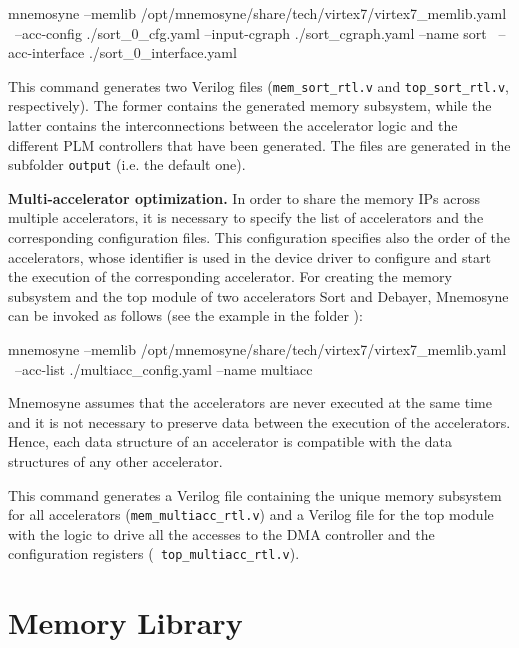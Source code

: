 \begin{commandshell}{}
  mnemosyne --memlib /opt/mnemosyne/share/tech/virtex7/virtex7_memlib.yaml  \                 --acc-config ./sort_0_cfg.yaml --input-cgraph ./sort_cgraph.yaml --name sort \
        --acc-interface ./sort_0_interface.yaml \end{commandshell}

\noindent This command generates two Verilog files ({\tt mem\_sort\_rtl.v}
and {\tt top\_sort\_rtl.v}, respectively). The former contains the
generated memory subsystem, while the latter contains the interconnections
between the accelerator logic and the different PLM controllers that have been
generated.  The files are generated in the subfolder {\tt output} (i.e. the
default one).

\vspace{4pt}
{\bf Multi-accelerator optimization.} In order to share the memory IPs across
multiple accelerators, it is necessary to specify the list of accelerators and
the corresponding configuration files. This configuration specifies also the
order of the accelerators, whose identifier is used in the device driver to
configure and start the execution of the corresponding accelerator. For creating the
memory subsystem and the top module of two accelerators {\sc Sort} and {\sc
Debayer}, {\sc Mnemosyne} can be invoked as follows (see the example in the folder ):

\begin{commandshell}{}
  mnemosyne --memlib /opt/mnemosyne/share/tech/virtex7/virtex7_memlib.yaml  \                 --acc-list ./multiacc_config.yaml --name multiacc
\end{commandshell}

\begin{lattention}
{\sc Mnemosyne} assumes that the accelerators are never executed at the same
time and it is not necessary to preserve data between the execution of the
accelerators. Hence, each data structure of an accelerator is compatible with 
the data structures of any other accelerator.
\end{lattention}

\noindent This command generates a Verilog file containing the unique memory
subsystem for all accelerators ({\tt mem\_multiacc\_rtl.v}) and a
Verilog file for the top module with the logic to drive all the accesses to the
DMA controller and the configuration registers ({\tt
top\_multiacc\_rtl.v}).

\section{Memory Library}\label{sec:library}

